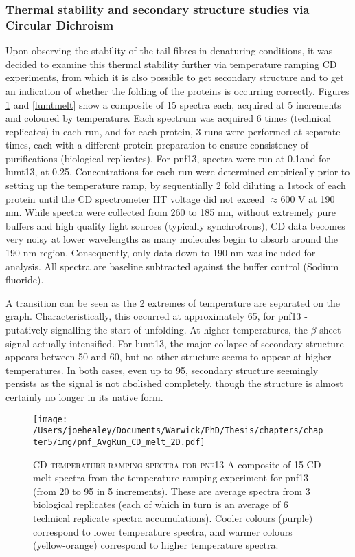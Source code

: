 \subsubsection{Thermal stability and secondary structure studies via Circular Dichroism}
Upon observing the stability of the tail fibres in denaturing conditions, it was decided to examine this thermal stability further via temperature ramping CD experiments, from which it is also possible to get secondary structure and to get an indication of whether the folding of the proteins is occurring correctly. Figures \ref{pnfmelt} and \ref{lumtmelt} show a composite of 15 spectra each, acquired at 5\degC{} increments and coloured by temperature. Each spectrum was acquired 6 times (technical replicates) in each run, and for each protein, 3 runs were performed at separate times, each with a different protein preparation to ensure consistency of purifications (biological replicates). For pnf13, spectra were run at 0.1\mgml and for lumt13, at 0.25\mgml. Concentrations for each run were determined empirically prior to setting up the temperature ramp, by sequentially 2 fold diluting a 1\mgml stock of each protein until the CD spectrometer HT voltage did not exceed $\approx$600 V at 190 nm. While spectra were collected from 260 to 185 nm, without extremely pure buffers and high quality light sources (typically synchrotrons), CD data becomes very noisy at lower wavelengths as many molecules begin to absorb around the 190 nm region. Consequently, only data down to 190 nm was included for analysis. All spectra are baseline subtracted against the buffer control (Sodium fluoride).

A transition can be seen as the 2 extremes of temperature are separated on the graph. Characteristically, this occurred at approximately 65\degC, for pnf13 - putatively signalling the start of unfolding. At higher temperatures, the $\beta$-sheet signal actually intensified. For lumt13, the major collapse of secondary structure appears between 50 and 60\degC, but no other structure seems to appear at higher temperatures. In both cases, even up to 95\degC, secondary structure seemingly persists as the signal is not abolished completely, though the structure is almost certainly no longer in its native form.


\begin{figure}[p]
	\centering
	\texttt{[image: /Users/joehealey/Documents/Warwick/PhD/Thesis/chapters/chapter5/img/pnf\_AvgRun\_CD\_melt\_2D.pdf]}
	\captionsetup{singlelinecheck=off, justification=justified, font=footnotesize, aboveskip=10pt}
	\caption[pnf13 CD melt plot]{\textsc{\normalsize CD temperature ramping spectra for pnf13}\vspace{0.1cm} \newline A composite of 15 CD melt spectra from the temperature ramping experiment for pnf13 (from 20\degC{} to 95\degC{} in 5\degC{} increments). These are average spectra from 3 biological replicates (each of which in turn is an average of 6 technical replicate spectra accumulations). Cooler colours (purple) correspond to lower temperature spectra, and warmer colours (yellow-orange) correspond to higher temperature spectra.}
	\label{pnfmelt}
	\end{figure}
	
